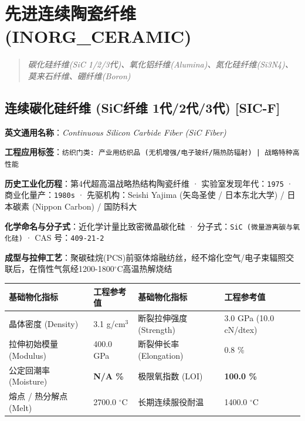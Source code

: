 \documentclass[11pt,openright,twoside,UTF8]{ctexbook}
\begin{document}
\chapter{先进连续陶瓷纤维 (INORG\_CERAMIC)}
\begin{quote}
\small\itshape
碳化硅纤维(SiC 1/2/3代)、氧化铝纤维(Alumina)、氮化硅纤维(Si3N4)、莫来石纤维、硼纤维(Boron)
\end{quote}

\section{连续碳化硅纤维 (SiC纤维 1代/2代/3代) [SIC-F]}
\label{sec:sic-f}

\noindent\textbf{英文通用名称}：\textit{Continuous Silicon Carbide Fiber (SiC Fiber)}\par
\noindent\textbf{工程应用标签}：\texttt{纺织门类: 产业用纺织品 (无机增强/电子玻纤/隔热防辐射) | 战略特种高性能}\par
\noindent\textbf{历史工业化历程}：第4代超高温战略热结构陶瓷纤维 · 实验室发现年代：\texttt{1975} · 商业化量产：\texttt{1980s} · 先驱机构：Seishi Yajima (矢岛圣使 / 日本东北大学) / 日本碳素 (Nippon Carbon) / 国防科大\par
\noindent\textbf{化学命名与分子式}：近化学计量比致密微晶碳化硅 · 分子式：\texttt{SiC (微量游离碳与氧化硅)} · CAS 号：\texttt{409-21-2}\par
\noindent\textbf{成型与拉伸工艺}：聚碳硅烷(PCS)前驱体熔融纺丝，经不熔化空气/电子束辐照交联后，在惰性气氛经1200-1800$^\circ\mathrm{C}$高温热解烧结\par

\vspace{0.15cm}
\begin{center}
\small
\begin{tabularx}{\textwidth}{p{3.8cm}Xp{3.8cm}X}
\toprule
\textbf{基础物化指标} & \textbf{工程参考值} & \textbf{基础物化指标} & \textbf{工程参考值} \\
\midrule
晶体密度 (Density) & 3.1 g/cm$^3$ & 断裂拉伸强度 (Strength) & 3.0 GPa (10.0 cN/dtex) \\
拉伸初始模量 (Modulus) & 400.0 GPa & 断裂伸长率 (Elongation) & 0.8 \% \\
公定回潮率 (Moisture) & \textbf{N/A \%} & 极限氧指数 (LOI) & \textbf{100.0 \%} \\
熔点 / 热分解点 (Melt) & 2700.0 $^\circ\mathrm{C}$ & 长期连续服役耐温 & 1400.0 $^\circ\mathrm{C}$ \\
\bottomrule
\end{tabularx}
\end{center}
\vspace{0.15cm}
\end{document}
